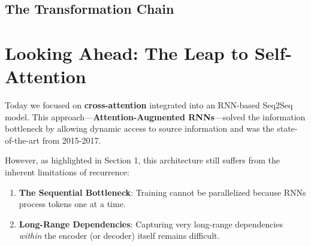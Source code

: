 \documentclass{article}
\begin{document}
\subsection{The Transformation Chain}

\begin{center}
\end{center}

\section{Looking Ahead: The Leap to Self-Attention}

Today we focused on \textbf{cross-attention} integrated into an RNN-based Seq2Seq model. This approach---\textbf{Attention-Augmented RNNs}---solved the information bottleneck by allowing dynamic access to source information and was the state-of-the-art from 2015-2017.

However, as highlighted in Section 1, this architecture still suffers from the inherent limitations of recurrence:

\begin{enumerate}
    \item \textbf{The Sequential Bottleneck}: Training cannot be parallelized because RNNs process tokens one at a time.
    \item \textbf{Long-Range Dependencies}: Capturing very long-range dependencies \textit{within} the encoder (or decoder) itself remains difficult.
\end{enumerate}
\end{document}
